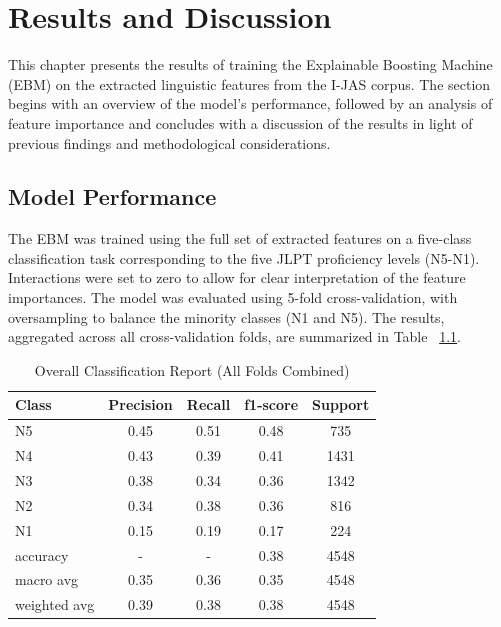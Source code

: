 \chapter{Results and Discussion}
This chapter presents the results of training the Explainable Boosting Machine (EBM) on the extracted linguistic
features from the I-JAS corpus. The section begins with an overview of the model's performance, followed by an
analysis of feature importance and concludes with a discussion of the results in light of previous findings and
methodological considerations.


\section{Model Performance}

The EBM was trained using the full set of extracted features on a five-class classification task corresponding to
the five JLPT proficiency levels (N5-N1). Interactions were set to zero to allow for clear interpretation of the
feature importances. The model was
evaluated using 5-fold cross-validation,
with oversampling to balance the minority classes (N1 and N5). The results, aggregated across all cross-validation
folds, are summarized
in Table~
\ref{tab:trainingResults}.


\begin{table}[h!]
    \centering
    \begin{tabular}{lcccc}
        \hline \textbf{Class} & \textbf{Precision} & \textbf{Recall} & \textbf{f1-score} & \textbf{Support} \\ \hline
        N5    &   0.45   &   0.51   &   0.48   &    735\\
          N4    &   0.43   &   0.39   &   0.41   &   1431\\
          N3    &   0.38   &   0.34   &   0.36  &    1342\\
          N2  &     0.34   &   0.38  &    0.36   &    816\\
          N1    &   0.15   &   0.19   &   0.17    &   224\\ \hline
        accuracy &   -    &      -    &     0.38  &    4548\\
   macro avg  &     0.35   &   0.36  &    0.35   &   4548\\
weighted avg  &     0.39  &    0.38    &  0.38   &   4548\\ \hline
    \end{tabular}
    \caption[Overall Classification Report (All Folds Combined)]{Overall Classification Report (All Folds Combined)}
    \label{tab:trainingResults}
\end{table}

